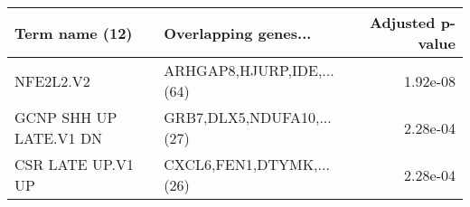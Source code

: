 \begin{tabular}{llr}
\toprule
        Term name (12) &      Overlapping genes... &  Adjusted p-value \\
\midrule
             NFE2L2.V2 & ARHGAP8,HJURP,IDE,...(64) &          1.92e-08 \\
GCNP SHH UP LATE.V1 DN & GRB7,DLX5,NDUFA10,...(27) &          2.28e-04 \\
     CSR LATE UP.V1 UP &  CXCL6,FEN1,DTYMK,...(26) &          2.28e-04 \\
\bottomrule
\end{tabular}
